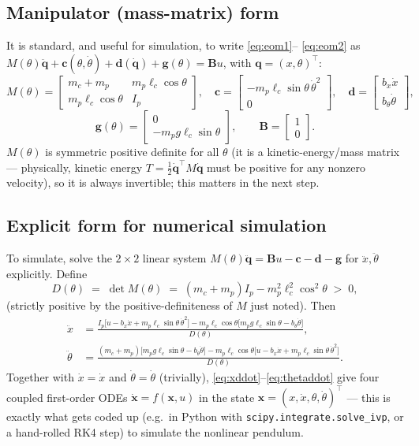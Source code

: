 \documentclass[11pt]{article}
\newcommand{\mb}[1]{\mathbf{#1}}
\begin{document}
\subsection{Manipulator (mass-matrix) form}
It is standard, and useful for simulation, to write \eqref{eq:eom1}--
\eqref{eq:eom2} as $M(\theta)\ddot{\mb q} + \mb c(\theta,\dot\theta) +
\mb d(\dot{\mb q}) + \mb g(\theta) = \mb B u$, with $\mb q =
(x,\theta)^\top$:
\[
  M(\theta) = \begin{bmatrix} m_c+m_p & m_p\ell_c\cos\theta \\
  m_p\ell_c\cos\theta & I_p \end{bmatrix},\quad
  \mb c = \begin{bmatrix} -m_p\ell_c\sin\theta\,\dot\theta^2 \\ 0
  \end{bmatrix},\quad
  \mb d = \begin{bmatrix} b_x\dot x \\ b_\theta\dot\theta\end{bmatrix},
\]
\[
  \mb g(\theta) = \begin{bmatrix} 0 \\ -m_p g\ell_c\sin\theta
  \end{bmatrix}, \qquad
  \mb B = \begin{bmatrix} 1 \\ 0 \end{bmatrix}.
\]
$M(\theta)$ is symmetric positive definite for all $\theta$ (it is a
kinetic-energy/mass matrix — physically, kinetic energy $T =
\tfrac12\dot{\mb q}^\top M\dot{\mb q}$ must be positive for any nonzero
velocity), so it is always invertible; this matters in the next step.

\subsection{Explicit form for numerical simulation}
To simulate, solve the $2\times2$ linear system $M(\theta)\ddot{\mb q} =
\mb Bu - \mb c - \mb d - \mb g$ for $\ddot x,\ddot\theta$ explicitly.
Define
\begin{equation}
  D(\theta) \;=\; \det M(\theta) \;=\; (m_c+m_p)I_p - m_p^2\ell_c^2\cos^2\theta
  \;>\;0, \label{eq:Dtheta}
\end{equation}
(strictly positive by the positive-definiteness of $M$ just noted). Then
\begin{align}
  \ddot x &= \frac{I_p\big[u - b_x\dot x + m_p\ell_c\sin\theta\,\dot\theta^2\big]
  - m_p\ell_c\cos\theta\big[m_p g\ell_c\sin\theta - b_\theta\dot\theta\big]}
  {D(\theta)}, \label{eq:xddot}\\[4pt]
  \ddot\theta &= \frac{(m_c+m_p)\big[m_p g\ell_c\sin\theta - b_\theta\dot\theta\big]
  - m_p\ell_c\cos\theta\big[u - b_x\dot x + m_p\ell_c\sin\theta\,\dot\theta^2\big]}
  {D(\theta)}. \label{eq:thetaddot}
\end{align}
Together with $\dot x = \dot x$ and $\dot\theta=\dot\theta$ (trivially),
\eqref{eq:xddot}--\eqref{eq:thetaddot} give four coupled first-order ODEs
$\dot{\mb x} = f(\mb x, u)$ in the state $\mb x = (x,\dot x,\theta,
\dot\theta)^\top$ — this is exactly what gets coded up (e.g.\ in Python
with \texttt{scipy.integrate.solve\_ivp}, or a hand-rolled RK4 step) to
simulate the nonlinear pendulum.
\end{document}
